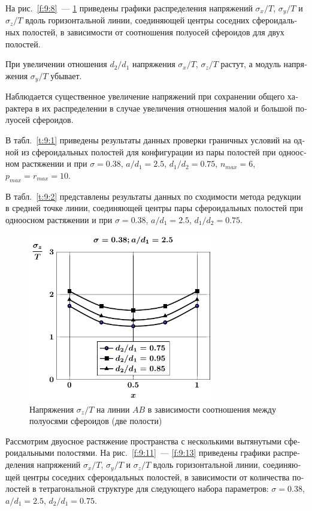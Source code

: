 \begin{russian}
На рис.~\ref{f:9:8}~--- \ref{f:9:10} приведены графики распределения напряжений $\sigma_x/T$, $\sigma_y/T$ и $\sigma_z/T$ вдоль горизонтальной  линии, соединяющей центры соседних сфероидальных полостей, в зависимости от соотношения полуосей сфероидов для двух полостей.

При увеличении отношения $d_2/d_1$ напряжения $\sigma_x/T$, $\sigma_z/T$ растут, а модуль напряжения $\sigma_y/T$ убывает.

Наблюдается существенное увеличение напряжений при сохранении общего характера в их распределении в случае увеличения отношения малой и большой полуосей сфероидов.

В табл.~\ref{t:9:1} приведены результаты данных проверки граничных условий на одной из сфероидальных полостей для конфигурации из пары полостей при одноосном растяжении и при $\sigma=0.38$, $a/d_1=2.5$, $d_1/d_2=0.75$, $n_{max}=6$, $p_{max}=r_{max}=10$.

В табл.~\ref{t:9:2} представлены результаты данных по сходимости метода редукции в средней точке линии, соединяющей центры пары сфероидальных полостей при одноосном растяжении и при $\sigma=0.38$, $a/d_1=2.5$, $d_1/d_2=0.75$.

\begin{figure}
\centering
\includegraphics[width=8cm]{cav2-d-sig_z.pdf}
\caption{Напряжения $\sigma_z/T$ на линии $AB$ в зависимости соотношения между полуосями сфероидов (две полости)}
\label{f:9:10}
\end{figure}

Рассмотрим двуосное растяжение пространства с несколькими вытянутыми сфероидальными полостями. На рис.~\ref{f:9:11}~--- \ref{f:9:13} приведены графики распределения напряжений $\sigma_x/T$, $\sigma_y/T$ и $\sigma_z/T$ вдоль горизонтальной  линии, соединяющей центры соседних сфероидальных полостей, в зависимости от количества полостей в тетрагональной структуре для следующего набора параметров: $\sigma=0.38$, $a/d_1=2.5$, $d_2/d_1=0.75$.


\end{russian}
